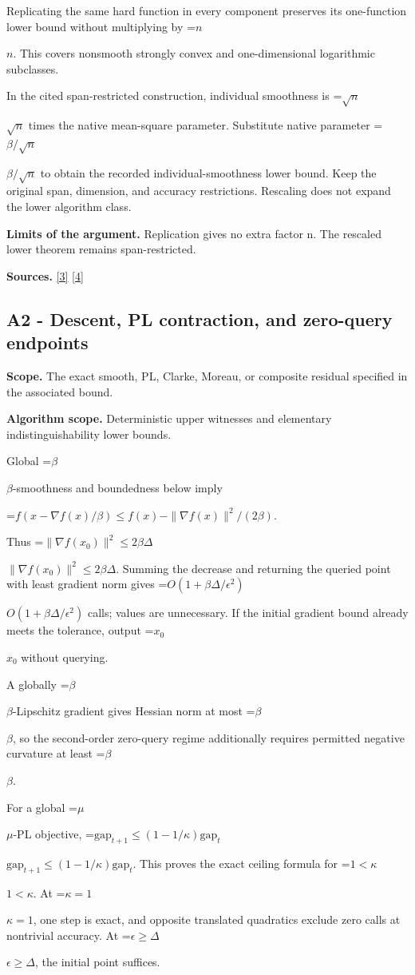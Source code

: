\documentclass[10pt,a4paper]{article}
\newcommand{\AtlasMath}[1]{\par\begingroup\centering\setbox0=\hbox{$\displaystyle #1$}\ifdim\wd0>1.4\linewidth\typeout{ATLAS WIDE FORMULA: \the\wd0}\fi\ifdim\wd0>\linewidth\resizebox{\linewidth}{!}{\box0}\else\box0\fi\par\endgroup}
\newcommand{\AtlasInlineMath}[1]{\begingroup\setbox0=\hbox{$#1$}\ifdim\wd0>.4\linewidth\endgroup\AtlasMath{#1}\else\endgroup$#1$\fi}
\begin{document}
Replicating the same hard function in every component preserves its one-function lower bound without multiplying by \AtlasInlineMath{n}. This covers nonsmooth strongly convex and one-dimensional logarithmic subclasses.

In the cited span-restricted construction, individual smoothness is \AtlasInlineMath{\sqrt n} times the native mean-square parameter. Substitute native parameter \AtlasInlineMath{\beta/\sqrt n} to obtain the recorded individual-smoothness lower bound. Keep the original span, dimension, and accuracy restrictions. Rescaling does not expand the lower algorithm class.

\textbf{Limits of the argument.} Replication gives no extra factor n. The rescaled lower theorem remains span-restricted.

\textbf{Sources.} \href{https://proceedings.mlr.press/v97/zhou19b/zhou19b.pdf}{[3]} \href{https://arxiv.org/pdf/1405.4980}{[4]}

\subsection{A2 - Descent, PL contraction, and zero-query endpoints}
\textbf{Scope.} The exact smooth, PL, Clarke, Moreau, or composite residual specified in the associated bound.

\textbf{Algorithm scope.} Deterministic upper witnesses and elementary indistinguishability lower bounds.

Global \AtlasInlineMath{\beta}-smoothness and boundedness below imply

\AtlasMath{f(x-\nabla f(x)/\beta)\le f(x)-\|\nabla f(x)\|^2/(2\beta).}

Thus \AtlasInlineMath{\|\nabla f(x_0)\|^2\le2\beta\Delta}. Summing the decrease and returning the queried point with least gradient norm gives \AtlasInlineMath{O(1+\beta\Delta/\epsilon^2)} calls; values are unnecessary. If the initial gradient bound already meets the tolerance, output \AtlasInlineMath{x_0} without querying.

A globally \AtlasInlineMath{\beta}-Lipschitz gradient gives Hessian norm at most \AtlasInlineMath{\beta}, so the second-order zero-query regime additionally requires permitted negative curvature at least \AtlasInlineMath{\beta}.

For a global \AtlasInlineMath{\mu}-PL objective,
\AtlasInlineMath{\mathrm{gap}_{t+1}\le(1-1/\kappa)\mathrm{gap}_t}.
This proves the exact ceiling formula for \AtlasInlineMath{1<\kappa}. At \AtlasInlineMath{\kappa=1}, one step is exact, and opposite translated quadratics exclude zero calls at nontrivial accuracy. At \AtlasInlineMath{\epsilon\ge\Delta}, the initial point suffices.
\end{document}

